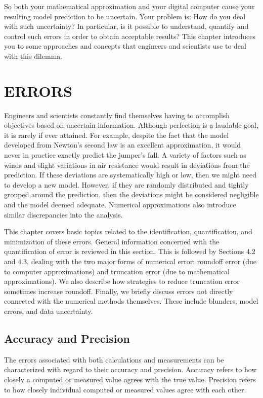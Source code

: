 \documentclass[../main.tex]{subfiles}
\begin{document}
So both your mathematical approximation and your digital computer cause your resulting
model prediction to be uncertain. Your problem is: How do you deal with such uncertainty?
In particular, is it possible to understand, quantify and control such errors in
order to obtain acceptable results? This chapter introduces you to some approaches and
concepts that engineers and scientists use to deal with this dilemma.

\bigskip
\section[ERRORS]{ERRORS}

\noindent Engineers and scientists constantly find themselves having to accomplish objectives based
on uncertain information. Although perfection is a laudable goal, it is rarely if ever attained.
For example, despite the fact that the model developed from Newton's second law
is an excellent approximation, it would never in practice exactly predict the jumper's fall.
A variety of factors such as winds and slight variations in air resistance would result in deviations
from the prediction. If these deviations are systematically high or low, then we
might need to develop a new model. However, if they are randomly distributed and tightly
grouped around the prediction, then the deviations might be considered negligible and the
model deemed adequate. Numerical approximations also introduce similar discrepancies
into the analysis.

This chapter covers basic topics related to the identification, quantification, and minimization
of these errors. General information concerned with the quantification of error is
reviewed in this section. This is followed by Sections 4.2 and 4.3, dealing with the two
major forms of numerical error: roundoff error (due to computer approximations) and truncation
error (due to mathematical approximations). We also describe how strategies to reduce
truncation error sometimes increase roundoff. Finally, we briefly discuss errors not
directly connected with the numerical methods themselves. These include blunders, model
errors, and data uncertainty.

\subsection{Accuracy and Precision}
\noindent
The errors associated with both calculations and measurements can be characterized with
regard to their accuracy and precision. Accuracy refers to how closely a computed or measured
value agrees with the true value. Precision refers to how closely individual computed
or measured values agree with each other.
\end{document}
